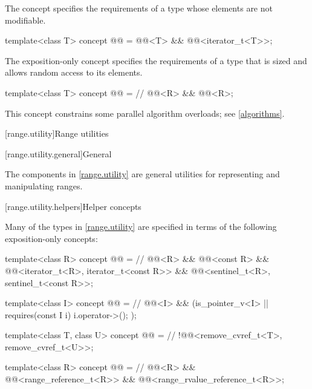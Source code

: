 \pnum
The  concept specifies the requirements of a
 type whose elements are not modifiable.

\begin{itemdecl}
template<class T>
  concept @@ =
    @@<T> && @@<iterator_t<T>>;
\end{itemdecl}

\pnum
The exposition-only concept 
specifies the requirements of a  type
that is sized and allows random access to its elements.

\begin{itemdecl}
template<class T>
  concept @@ =           // \expos
    @@<R> && @@<R>;
\end{itemdecl}
\begin{note}
This concept constrains some parallel algorithm overloads;
see \ref{algorithms}.
\end{note}

[range.utility]{Range utilities}

[range.utility.general]{General}

\pnum
The components in \ref{range.utility} are general utilities for representing and
manipulating ranges.

[range.utility.helpers]{Helper concepts}

\pnum
Many of the types in \ref{range.utility} are specified in terms of
the following exposition-only concepts:

\begin{codeblock}
template<class R>
  concept @@ =                                     // \expos
    @@<R> && @@<const R> &&
    @@<iterator_t<R>, iterator_t<const R>> &&
    @@<sentinel_t<R>, sentinel_t<const R>>;

template<class I>
  concept @@ =                                       // \expos
    @@<I> && (is_pointer_v<I> || requires(const I i) { i.operator->(); });

template<class T, class U>
  concept @@ =                                  // \expos
    !@@<remove_cvref_t<T>, remove_cvref_t<U>>;

template<class R>
  concept @@ =                   // \expos
    @@<R> && @@<range_reference_t<R>> &&
    @@<range_rvalue_reference_t<R>>;
\end{codeblock}

